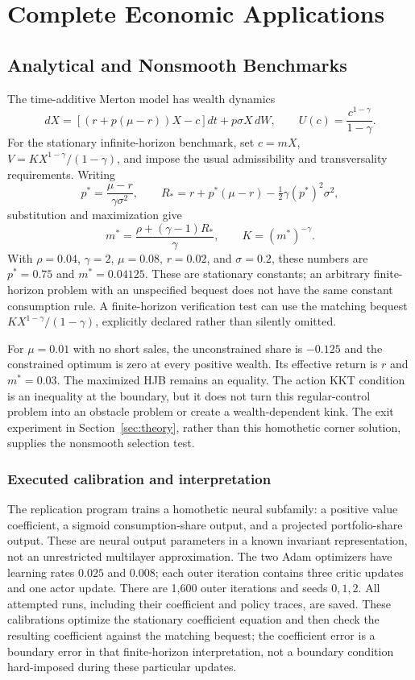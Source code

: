 \section{Complete Economic Applications}\label{app:r15applications}
\subsection{Analytical and Nonsmooth Benchmarks}\label{sec:benchmarks}
The time-additive Merton model has wealth dynamics
\[
 dX=[(r+p(\mu-r))X-c]dt+p\sigma X\,dW,
 \qquad U(c)=\frac{c^{1-\gamma}}{1-\gamma}.
\]
For the stationary infinite-horizon benchmark, set $c=mX$, $V=KX^{1-\gamma}/(1-\gamma)$, and impose the usual admissibility and transversality requirements. Writing
\[
 p^*=\frac{\mu-r}{\gamma\sigma^2},\qquad
 R_*=r+p^*(\mu-r)-\tfrac12\gamma(p^*)^2\sigma^2,
\]
substitution and maximization give
\begin{equation}\label{eq:merton}
 m^*=\frac{\rho+(\gamma-1)R_*}{\gamma},\qquad K=(m^*)^{-\gamma}.
\end{equation}
With $\rho=0.04$, $\gamma=2$, $\mu=0.08$, $r=0.02$, and $\sigma=0.2$, these numbers are $p^*=0.75$ and $m^*=0.04125$. These are stationary constants; an arbitrary finite-horizon problem with an unspecified bequest does not have the same constant consumption rule. A finite-horizon verification test can use the matching bequest $KX^{1-\gamma}/(1-\gamma)$, explicitly declared rather than silently omitted.

For $\mu=0.01$ with no short sales, the unconstrained share is $-0.125$ and the constrained optimum is zero at every positive wealth. Its effective return is $r$ and $m^*=0.03$. The maximized HJB remains an equality. The action KKT condition is an inequality at the boundary, but it does not turn this regular-control problem into an obstacle problem or create a wealth-dependent kink. The exit experiment in Section~\ref{sec:theory}, rather than this homothetic corner solution, supplies the nonsmooth selection test.

\subsubsection{Executed calibration and interpretation}
The replication program trains a homothetic neural subfamily: a positive value coefficient, a sigmoid consumption-share output, and a projected portfolio-share output. These are neural output parameters in a known invariant representation, not an unrestricted multilayer approximation. The two Adam optimizers have learning rates $0.025$ and $0.008$; each outer iteration contains three critic updates and one actor update. There are 1,600 outer iterations and seeds $0,1,2$. All attempted runs, including their coefficient and policy traces, are saved. These calibrations optimize the stationary coefficient equation and then check the resulting coefficient against the matching bequest; the coefficient error is a boundary error in that finite-horizon interpretation, not a boundary condition hard-imposed during these particular updates.

